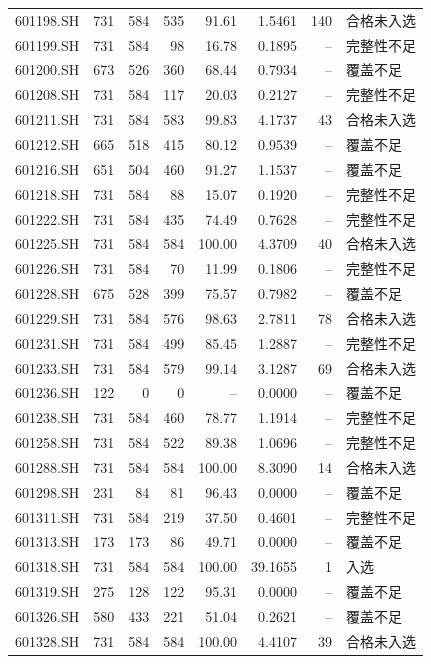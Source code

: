 \documentclass[10pt,a4paper]{article}
\begin{document}
\begin{longtable}{lrrr r r r l}
601198.SH & 731 & 584 & 535 & 91.61 & 1.5461 & 140 & 合格未入选\\
601199.SH & 731 & 584 & 98 & 16.78 & 0.1895 & -- & 完整性不足\\
601200.SH & 673 & 526 & 360 & 68.44 & 0.7934 & -- & 覆盖不足\\
601208.SH & 731 & 584 & 117 & 20.03 & 0.2127 & -- & 完整性不足\\
601211.SH & 731 & 584 & 583 & 99.83 & 4.1737 & 43 & 合格未入选\\
601212.SH & 665 & 518 & 415 & 80.12 & 0.9539 & -- & 覆盖不足\\
601216.SH & 651 & 504 & 460 & 91.27 & 1.1537 & -- & 覆盖不足\\
601218.SH & 731 & 584 & 88 & 15.07 & 0.1920 & -- & 完整性不足\\
601222.SH & 731 & 584 & 435 & 74.49 & 0.7628 & -- & 完整性不足\\
601225.SH & 731 & 584 & 584 & 100.00 & 4.3709 & 40 & 合格未入选\\
601226.SH & 731 & 584 & 70 & 11.99 & 0.1806 & -- & 完整性不足\\
601228.SH & 675 & 528 & 399 & 75.57 & 0.7982 & -- & 覆盖不足\\
601229.SH & 731 & 584 & 576 & 98.63 & 2.7811 & 78 & 合格未入选\\
601231.SH & 731 & 584 & 499 & 85.45 & 1.2887 & -- & 完整性不足\\
601233.SH & 731 & 584 & 579 & 99.14 & 3.1287 & 69 & 合格未入选\\
601236.SH & 122 & 0 & 0 & -- & 0.0000 & -- & 覆盖不足\\
601238.SH & 731 & 584 & 460 & 78.77 & 1.1914 & -- & 完整性不足\\
601258.SH & 731 & 584 & 522 & 89.38 & 1.0696 & -- & 完整性不足\\
601288.SH & 731 & 584 & 584 & 100.00 & 8.3090 & 14 & 合格未入选\\
601298.SH & 231 & 84 & 81 & 96.43 & 0.0000 & -- & 覆盖不足\\
601311.SH & 731 & 584 & 219 & 37.50 & 0.4601 & -- & 完整性不足\\
601313.SH & 173 & 173 & 86 & 49.71 & 0.0000 & -- & 覆盖不足\\
601318.SH & 731 & 584 & 584 & 100.00 & 39.1655 & 1 & 入选\\
601319.SH & 275 & 128 & 122 & 95.31 & 0.0000 & -- & 覆盖不足\\
601326.SH & 580 & 433 & 221 & 51.04 & 0.2621 & -- & 覆盖不足\\
601328.SH & 731 & 584 & 584 & 100.00 & 4.4107 & 39 & 合格未入选\\

\end{longtable}
\end{document}
